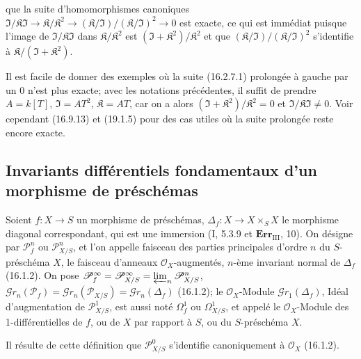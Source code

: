 que la suite d'homomorphismes canoniques
$\mathfrak{I}/\mathfrak{K}\mathfrak{I}\to
\mathfrak{K}/\mathfrak{K}^2\to
(\mathfrak{K}/\mathfrak{I})/(\mathfrak{K}/\mathfrak{I})^2\to 0$
est exacte, ce qui est immédiat puisque l'image de
$\mathfrak{I}/\mathfrak{K}\mathfrak{I}$ dans
$\mathfrak{K}/\mathfrak{K}^2$ est
$(\mathfrak{I}+\mathfrak{K}^2)/\mathfrak{K}^2$ et que
$(\mathfrak{K}/\mathfrak{I})/(\mathfrak{K}/\mathfrak{I})^2$ s'identifie à
$\mathfrak{K}/(\mathfrak{I}+\mathfrak{K}^2)$.

Il est facile de donner des exemples où la suite (16.2.7.1) prolongée à gauche
par un 0 n'est plus exacte; avec les notations précédentes, il suffit de
prendre $A=k[T]$, $\mathfrak{I}=AT^2$, $\mathfrak{K}=AT$, car on a alors
$(\mathfrak{I}+\mathfrak{K}^2)/\mathfrak{K}^2=0$ et
$\mathfrak{I}/\mathfrak{K}\mathfrak{I}\neq 0$. Voir cependant (16.9.13) et
(19.1.5) pour des cas utiles où la suite prolongée reste encore exacte.

\subsection{Invariants différentiels fondamentaux d'un morphisme de préschémas}

\begin{definition}[16.3.1]
Soient $f:X\to S$ un morphisme de préschémas, $\Delta_f:X\to X\times_S X$
le morphisme diagonal correspondant, qui est une immersion (I, 5.3.9 et
$\mathbf{Err}_{\mathrm{III}}$, 10). On désigne par $\mathscr{P}_f^n$ ou
$\mathscr{P}_{X/S}^n$, et l'on appelle faisceau des parties principales d'ordre $n$
du $S$-préschéma $X$, le faisceau d'anneaux $\mathcal{O}_X$-augmentés, $n$-ème
invariant normal de $\Delta_f$ (16.1.2). On pose
$\mathscr{P}_f^\infty=\mathscr{P}_{X/S}^\infty=
\varprojlim_n\mathscr{P}_{X/S}^n$,
$\mathscr{G}r_n(\mathscr{P}_f)=\mathscr{G}r_n(\mathscr{P}_{X/S})=
\mathscr{G}r_n(\Delta_f)$ (16.1.2); le $\mathcal{O}_X$-Module
$\mathscr{G}r_1(\Delta_f)$, Idéal d'augmentation de $\mathscr{P}_{X/S}^1$, est
aussi noté $\Omega_f^1$ ou $\Omega_{X/S}^1$, et appelé le $\mathcal{O}_X$-Module
des 1-différentielles de $f$, ou de $X$ par rapport à $S$, ou du $S$-préschéma $X$.
\end{definition}

Il résulte de cette définition que $\mathscr{P}_{X/S}^0$ s'identifie
canoniquement à $\mathcal{O}_X$ (16.1.2).


